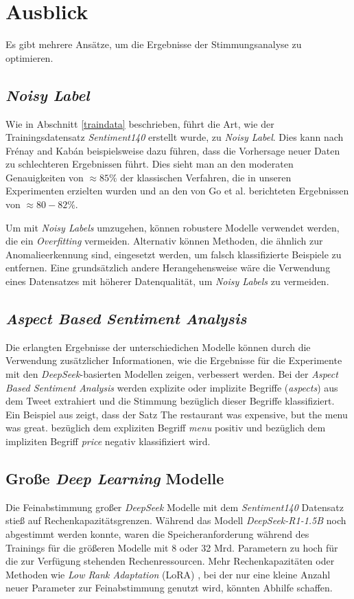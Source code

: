 \section{Ausblick}

Es gibt mehrere Ansätze, um die Ergebnisse der Stimmungsanalyse zu optimieren.

\subsection{\textit{Noisy Label}}
Wie in Abschnitt \ref{traindata} beschrieben, führt die Art, wie der Trainingsdatensatz \textit{Sentiment140} erstellt wurde, zu \textit{Noisy Label}.
Dies kann nach Fr{\'e}nay and Kab{\'a}n \cite{NoisyLabel2014} beispielsweise dazu führen, dass die Vorhersage neuer Daten zu schlechteren Ergebnissen führt.
Dies sieht man an den moderaten Genauigkeiten von $\approx{85}\%$ der klassischen Verfahren, die in unseren Experimenten erzielten wurden und an den von Go et al. \cite{go2009twitter} berichteten Ergebnissen von $\approx{80-82}\%$.

Um mit \textit{Noisy Labels} umzugehen, können robustere Modelle verwendet werden, die ein \textit{Overfitting} vermeiden.
Alternativ können Methoden, die ähnlich zur Anomalieerkennung sind, eingesetzt werden, um falsch klassifizierte Beispiele zu entfernen.
Eine grundsätzlich andere Herangehensweise wäre die Verwendung eines Datensatzes mit höherer Datenqualität, um \textit{Noisy Labels} zu vermeiden.

\subsection{\textit{Aspect Based Sentiment Analysis}}

Die erlangten Ergebnisse der unterschiedichen Modelle können durch die Verwendung zusätzlicher Informationen, wie die Ergebnisse für die Experimente mit den \textit{DeepSeek}-basierten Modellen zeigen, verbessert werden.
Bei der \textit{Aspect Based Sentiment Analysis} werden explizite oder implizite Begriffe (\textit{aspects}) aus dem Tweet extrahiert und die Stimmung bezüglich dieser Begriffe klassifiziert.
Ein Beispiel aus \cite{Hua_2024} zeigt, dass der Satz \glqq The restaurant was expensive, but the menu was great.\grqq{} bezüglich dem expliziten Begriff \textit{menu} positiv und bezüglich dem impliziten Begriff \textit{price} negativ klassifiziert wird.

\subsection{Große \textit{Deep Learning} Modelle}

Die Feinabstimmung großer \textit{DeepSeek} Modelle mit dem \textit{Sentiment140} Datensatz stieß auf Rechenkapazitätsgrenzen.
Während das Modell \textit{DeepSeek-R1-1.5B} noch abgestimmt werden konnte, waren die Speicheranforderung während des Trainings für die größeren Modelle mit 8 oder 32 Mrd. Parametern zu hoch für die zur Verfügung stehenden Rechenressourcen.
Mehr Rechenkapazitäten oder Methoden wie \textit{Low Rank Adaptation} (LoRA) \cite{lora2021}, bei der nur eine kleine Anzahl neuer Parameter zur Feinabstimmung genutzt wird, könnten Abhilfe schaffen.
